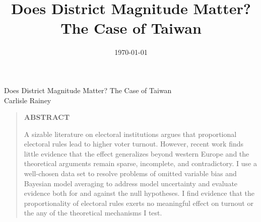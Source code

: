 \documentclass[12pt]{article}
\title{Does District Magnitude Matter? The Case of Taiwan}
\date{\today}
\begin{document}
\begin{center}
{\LARGE Does District Magnitude Matter? The Case of Taiwan}\\\vspace{2mm}
\vspace{10mm}
Carlisle Rainey\\

\end{center}
\vspace{10mm}
\begin{quote}
\begin{center} \bf{ABSTRACT}\end{center}
A sizable literature on electoral institutions argues that proportional electoral rules lead to higher voter turnout. However, recent work finds little evidence that the effect generalizes beyond western Europe and the theoretical arguments remain sparse, incomplete, and contradictory. I use a well-chosen data set to resolve problems of omitted variable bias and Bayesian model averaging to address model uncertainty and evaluate evidence both for and against the null hypotheses. I find evidence that the proportionality of electoral rules exerts no meaningful effect on turnout or the any of the theoretical mechanisms I test.
\end{quote}
\clearpage
\end{document}
